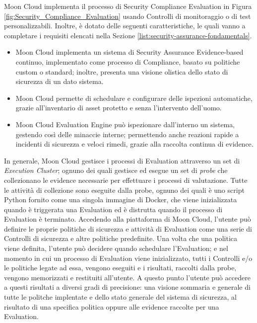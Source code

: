Moon Cloud implementa il processo di Security Compliance Evaluation in Figura \ref{fig:Security_Compliance_Evaluation} usando Controlli 
di monitoraggio o di test personalizzabili. Inoltre, è dotato delle seguenti caratteristiche, le quali vanno a completare i requisiti 
elencati nella Sezione \ref{list:security-assurance-fondamentals}.
\begin{itemize}
    \item Moon Cloud implementa un sistema di Security Assurance Evidence-based continuo, implementato come processo di Compliance,
    basato su politiche custom o standard; inoltre, presenta una visione olistica dello stato di sicurezza di un dato sistema.
    \item Moon Cloud permette di schedulare e configurare delle ispezioni automatiche, grazie all'inventario di asset protetto e senza
    l'intervento dell'uomo.
    \item Moon Cloud Evaluation Engine può ispezionare dall'interno un sistema, gestendo così delle minaccie interne; permettendo anche 
    reazioni rapide a incidenti di sicurezza e veloci rimedi, grazie alla raccolta continua di evidence.
\end{itemize}
In generale, Moon Cloud gestisce i processi di Evaluation attraverso un set di \textit{Execution Cluster}; ognuno dei quali gestisce 
ed esegue un set di \textit{probe} che collezionano le evidence necessarie per effettuare i processi di valutazione. 
Tutte le attività di collezione sono eseguite dalla probe, ognuno dei quali è uno script Python fornito come una singola immagine di Docker, 
che viene inizializzata quando è triggerata una Evaluation ed è distrutta quando il processo di Evaluation è terminato.\hfill\break
Accedendo alla piattaforma di Moon Cloud, l'utente può definire le proprie politiche di sicurezza e attività di Evaluation come 
una serie di Controlli di sicurezza e altre politiche predefinite. Una volta che una politica viene definita, l'utente può 
decidere quando schedulare l'Evaluation; e nel momento in cui un processo di Evaluation viene inizializzato, tutti i Controlli e/o le 
politiche legate ad essa, vengono eseguiti e i risultati, raccolti dalla probe, vengono memorizzati e restituiti all'utente. 
A questo punto l'utente può accedere a questi risultati a diversi gradi di precisione: una visione sommaria e generale di tutte le 
politche implentate e dello stato generale del sistema di sicurezza, al risultato di una specifica politica oppure alle evidence 
raccolte per una Evaluation.
\vspace{0.5 cm}
